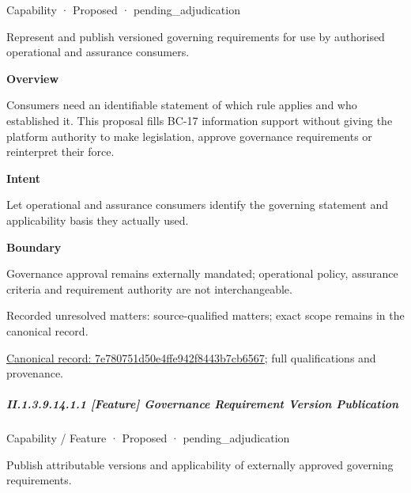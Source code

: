 \label{element:7e780751d50e4ffe942f8443b7cb6567}
{\small Capability · Proposed · pending\_adjudication}\par

Represent and publish versioned governing requirements for use by authorised operational and assurance consumers.



\textbf{Overview}



Consumers need an identifiable statement of which rule applies and who established it. This proposal fills BC-17 information support without giving the platform authority to make legislation, approve governance requirements or reinterpret their force.



\textbf{Intent}



Let operational and assurance consumers identify the governing statement and applicability basis they actually used.



\textbf{Boundary}



Governance approval remains externally mandated; operational policy, assurance criteria and requirement authority are not interchangeable.


{\small Recorded unresolved matters: source-qualified matters; exact scope remains in the canonical record.}\par
{\footnotesize \href{../../../../continuum/strategy/capability/7e780751d50e4ffe942f8443b7cb6567.md}{Canonical record: 7e780751d50e4ffe942f8443b7cb6567}; full qualifications and provenance.}\par
\subparagraph*{II.1.3.9.14.1.1 [Feature] Governance Requirement Version Publication}
\label{navigation:II.1.3.9.14.1.1}

\label{element:001a067a4b3b46bebfe945f1bef541ce}
{\small Capability / Feature · Proposed · pending\_adjudication}\par

Publish attributable versions and applicability of externally approved governing requirements.



